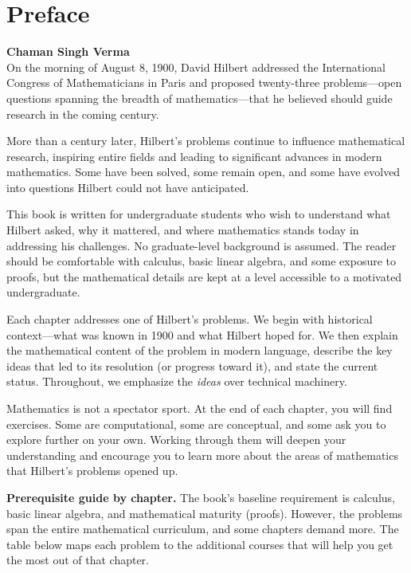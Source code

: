 
\chapter*{Preface}

\noindent\textbf{Chaman Singh Verma}\\[1em]

On the morning of August 8, 1900, David Hilbert addressed the International Congress of Mathematicians in Paris and proposed twenty-three problems---open questions spanning the breadth of mathematics---that he believed should guide research in the coming century.

More than a century later, Hilbert's problems continue to influence mathematical research, inspiring entire fields and leading to significant advances in modern mathematics. Some have been solved, some remain open, and some have evolved into questions Hilbert could not have anticipated.

This book is written for undergraduate students who wish to understand what Hilbert asked, why it mattered, and where mathematics stands today in addressing his challenges. No graduate-level background is assumed. The reader should be comfortable with calculus, basic linear algebra, and some exposure to proofs, but the mathematical details are kept at a level accessible to a motivated undergraduate.

Each chapter addresses one of Hilbert's problems. We begin with historical context---what was known in 1900 and what Hilbert hoped for. We then explain the mathematical content of the problem in modern language, describe the key ideas that led to its resolution (or progress toward it), and state the current status. Throughout, we emphasize the \emph{ideas} over technical machinery.

Mathematics is not a spectator sport. At the end of each chapter, you will find exercises. Some are computational, some are conceptual, and some ask you to explore further on your own. Working through them will deepen your understanding and encourage you to learn more about the areas of mathematics that Hilbert's problems opened up.

\vspace{2em}

\noindent\textbf{Prerequisite guide by chapter.}
The book's baseline requirement is calculus, basic linear algebra, and mathematical maturity (proofs). However, the problems span the entire mathematical curriculum, and some chapters demand more. The table below maps each problem to the additional courses that will help you get the most out of that chapter.

